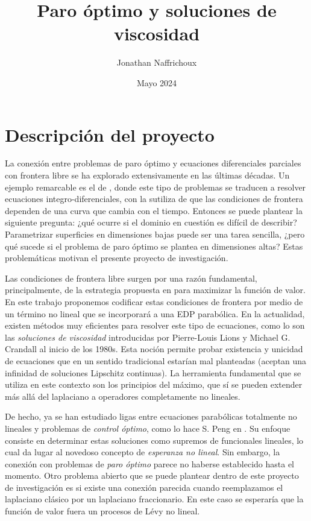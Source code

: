 \documentclass{article}
\title{Paro óptimo y soluciones de viscosidad}
\author{Jonathan Naffrichoux}
\date{Mayo 2024}
\numberwithin{equation}{section}
\begin{document}
\maketitle 

\section{Descripción del proyecto}
La conexión entre problemas de paro óptimo y ecuaciones diferenciales parciales con frontera libre se ha explorado extensivamente en las últimas décadas. Un ejemplo remarcable es el de \cite{peskir2006optimal}, donde este tipo de problemas se traducen a resolver ecuaciones integro-diferenciales, con la sutiliza de que las condiciones de frontera dependen de una curva que cambia con el tiempo. Entonces se puede plantear la siguiente pregunta: ¿qué ocurre si el dominio en cuestión es difícil de describir? Parametrizar superficies en dimensiones bajas puede ser una tarea sencilla, ¿pero qué sucede si el problema de paro óptimo se plantea en dimensiones altas? Estas problemáticas motivan el presente proyecto de investigación.

Las condiciones de frontera libre surgen por una razón fundamental, principalmente, de la estrategia propuesta en \cite{peskir2006optimal} para maximizar la función de valor. En este trabajo proponemos codificar estas condiciones de frontera por medio de un término no lineal que se incorporará a una EDP parabólica. 
En la actualidad, existen métodos muy eficientes para resolver este tipo de ecuaciones, como lo son las \emph{soluciones de viscosidad} introducidas por  Pierre-Louis Lions y Michael G. Crandall al inicio de los 1980s. Esta noción permite probar existencia y unicidad de ecuaciones que en un sentido tradicional estarían mal planteadas (aceptan una infinidad de soluciones Lipschitz continuas). La herramienta fundamental que se utiliza en este contexto son los principios del máximo, que sí se pueden extender más allá del laplaciano a operadores completamente no lineales.

De hecho, ya se han estudiado ligas entre ecuaciones parabólicas totalmente no lineales y problemas de \emph{control óptimo}, como lo hace S. Peng en \cite{peng2010nonlinear}. Su enfoque consiste en determinar estas soluciones como supremos de funcionales lineales, lo cual da lugar al novedoso concepto de \emph{esperanza no lineal}. Sin embargo, la conexión con problemas de \emph{paro óptimo} parece no haberse establecido hasta el momento.
Otro problema abierto que se puede plantear dentro de este proyecto de investigación es si existe una conexión parecida cuando reemplazamos el laplaciano clásico por un laplaciano fraccionario. En este caso se esperaría que la función de valor fuera un procesos de Lévy no lineal.
\end{document}
